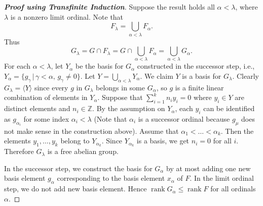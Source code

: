 \begin{proof}[\textbf{Proof using Transfinite Induction}]
  Suppose the result holds all $\alpha < \lambda$, where $\lambda$ is a nonzero limit ordinal. 
Note that 
$$F_\lambda = \bigcup_{\alpha < \lambda} F_\alpha.$$ 
Thus 
$$G_\lambda = G \cap F_\lambda = G \cap\bigcup_{\alpha < \lambda} F_\alpha = \bigcup_{\alpha < \lambda} G_\alpha.$$
For each $\alpha < \lambda$, let $Y_\alpha$ be the basis for $G_\alpha$ constructed in the successor step, i.e., $Y_{\alpha} = \{g_{\gamma}\,|\, \gamma<\alpha, \, g_{\gamma}\neq 0\}$. Let $Y = \bigcup_{\alpha < \lambda} Y_\alpha$. We claim $Y$ is a basis for $G_\lambda$. Clearly $G_{\lambda} = \langle Y\rangle$ since every $g$ in $G_{\lambda}$ belongs in some $G_\alpha$, so $g$ is a finite linear combination of elements in $Y_{\alpha}$. Suppose that $\sum_{i=1}^k n_i y_i = 0$ where $y_i \in Y$ are distinct elements and $n_i\in\mathbb{Z}$. By the assumption on $Y_{\alpha}$, each $y_i$ can be identified as $g_{\alpha_i}$ for some index $\alpha_i < \lambda$ (Note that $\alpha_i$ is a successor ordinal because $g_{\mu}$ does not make sense in the construction above). Assume that $\alpha_1<\dots< \alpha_k$. Then the  elements $y_1, \dots, y_k$ belong to  $Y_{\alpha_k}$. Since $Y_{\alpha_k}$ is a basis, we get $n_i = 0$ for all $i$. Therefore $G_\lambda$ is a free abelian group.

In the successor step, we construct the basis for $G_{\alpha}$ by at most adding one new basis element $g_\alpha$ corresponding to the basis element $x_\alpha$ of $F$. In the limit ordinal step, we do not add new basis element. Hence $\operatorname{rank}G_{\alpha} \leq\operatorname{rank} F$ for all ordinals $\alpha$.
\end{proof}

	
